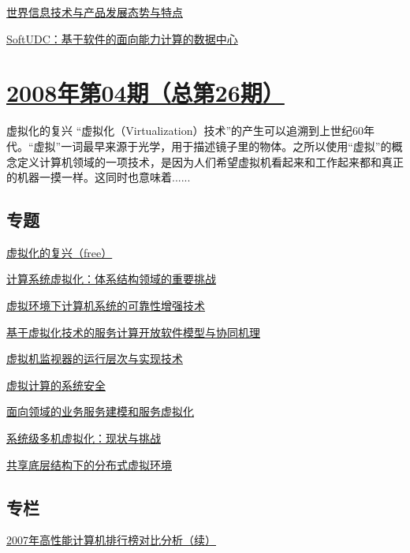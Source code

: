 \documentclass[a4paper]{article}
\begin{document}
\href{http://history.ccf.org.cn/resources/1190201776262/2010/04/15/027070.pdf}{世界信息技术与产品发展态势与特点}

\href{http://history.ccf.org.cn/resources/1190201776262/2010/04/15/027076.pdf}{SoftUDC：基于软件的面向能力计算的数据中心}


\section{\href{http://history.ccf.org.cn/sites/ccf/jsjtbbd.jsp?contentId=2542567628995}{\textbf{2008年第04期（总第26期）}}}
虚拟化的复兴 “虚拟化（Virtualization）技术”的产生可以追溯到上世纪60年代。“虚拟”一词最早来源于光学，用于描述镜子里的物体。之所以使用“虚拟”的概念定义计算机领域的一项技术，是因为人们希望虚拟机看起来和工作起来都和真正的机器一摸一样。这同时也意味着......
\subsection{专题}
\href{http://history.ccf.org.cn/resources/1190201776262/2010/04/15/026012.pdf}{虚拟化的复兴（free）}

\href{http://history.ccf.org.cn/resources/1190201776262/2010/04/15/026015.pdf}{计算系统虚拟化：体系结构领域的重要挑战}

\href{http://history.ccf.org.cn/resources/1190201776262/2010/04/15/026024.pdf}{虚拟环境下计算机系统的可靠性增强技术}

\href{http://history.ccf.org.cn/resources/1190201776262/2010/04/15/026034.pdf}{基于虚拟化技术的服务计算开放软件模型与协同机理}

\href{http://history.ccf.org.cn/resources/1190201776262/2010/04/15/026042.pdf}{虚拟机监视器的运行层次与实现技术}

\href{http://history.ccf.org.cn/resources/1190201776262/2010/04/15/026050.pdf}{虚拟计算的系统安全}

\href{http://history.ccf.org.cn/resources/1190201776262/2010/04/15/026056.pdf}{面向领域的业务服务建模和服务虚拟化}

\href{http://history.ccf.org.cn/resources/1190201776262/2010/04/15/026064.pdf}{系统级多机虚拟化：现状与挑战}

\href{http://history.ccf.org.cn/resources/1190201776262/2010/04/15/026076.pdf}{共享底层结构下的分布式虚拟环境}

\subsection{专栏}
\href{http://history.ccf.org.cn/resources/1190201776262/2010/04/15/026080.pdf}{2007年高性能计算机排行榜对比分析（续）}
\end{document}
